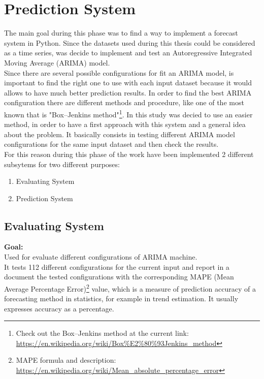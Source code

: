 \chapter{Prediction System}
The main goal during this phase was to find a way to implement a forecast system in Python.
Since the datasets used during this thesis could be considered as a time series, was decide to implement and test an Autoregressive Integrated Moving Average (ARIMA) model. \\
Since there are several possible configurations for fit an ARIMA model, is important to find the right one to use with each input dataset because it would allows to have much better prediction results.
In order to find the best ARIMA configuration there are different methods and procedure, like one of the most known that is "Box–Jenkins method"\footnote{Check out the Box–Jenkins method at the current link: \\ \url{https://en.wikipedia.org/wiki/Box\%E2\%80\%93Jenkins_method}}. In this study was decied to use an easier method, in order to have a first approach with this system and a general idea about the problem. It basically consists in testing different ARIMA model configurations for the same input dataset and then check the results.\\
For this reason during this phase of the work have been implemented 2 different subsytems for two different purposes:
\begin{enumerate}
\item Evaluating System
\item Prediction System
\end{enumerate}

\newpage
\section{Evaluating System}
\textbf{Goal:}\\ 
Used for evaluate different configurations of ARIMA machine. \\ It tests 112 different configurations for the current input and report in a document the tested configurations with the corresponding MAPE (Mean Average Percentage Error)\footnote{MAPE formula and description: \\ \url{https://en.wikipedia.org/wiki/Mean_absolute_percentage_error}} value, which is a measure of prediction accuracy of a forecasting method in statistics, for example in trend estimation. It usually expresses accuracy as a percentage.

